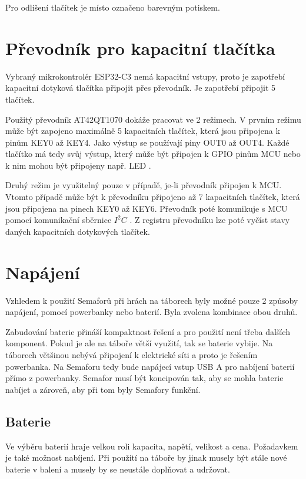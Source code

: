 Pro odlišení tlačítek je místo označeno barevným potiskem. 

\section{Převodník pro kapacitní tlačítka}
Vybraný mikrokontrolér ESP32-C3 nemá kapacitní vstupy, proto je zapotřebí kapacitní dotyková tlačítka připojit přes převodník. Je zapotřebí připojit 
5 tlačítek. 

Použitý převodník AT42QT1070 dokáže pracovat ve 2 režimech. V prvním režimu může být zapojeno maximálně 5 kapacitních tlačítek, která jsou připojena
k pinům KEY0 až KEY4. Jako výstup se používají piny OUT0 až OUT4. Každé tlačítko má tedy svůj výstup, který může být připojen k GPIO pinům MCU 
nebo k nim mohou být připojeny např. LED \cite{conv_cap_but_AT42QT1070_dtsh}. 

Druhý režim je využitelný pouze v případě, je-li převodník připojen k MCU. Vtomto případě může být k převodníku připojeno až 7 kapacitních tlačítek, 
která jsou připojena na pinech KEY0 až KEY6. Převodník poté komunikuje s MCU pomocí komunikační sběrnice $I^2C$ \cite{conv_cap_but_AT42QT1070_dtsh}. 
Z registru převodníku lze poté vyčíst stavy daných kapacitních dotykových tlačítek. 

\section{Napájení}
Vzhledem k použití Semaforů při hrách na táborech byly možné pouze 2 způsoby napájení, pomocí powerbanky nebo baterií. Byla zvolena kombinace obou druhů.

Zabudování baterie přináší kompaktnost řešení a pro použití není třeba dalších komponent. Pokud je ale na táboře větší využití, tak se baterie vybije.
Na táborech většinou nebývá připojení k elektrické síti a proto je řešením powerbanka. Na Semaforu tedy bude napájecí vstup USB A pro nabíjení baterií
přímo z powerbanky. Semafor musí být koncipován tak, aby se mohla baterie nabíjet a zároveň, aby při tom byly Semafory funkční.

\subsection{Baterie}
Ve výběru baterií hraje velkou roli kapacita, napětí, velikost a cena. Požadavkem je také možnost nabíjení. Při použití na táboře by jinak musely být stále 
nové baterie v balení a musely by se neustále doplňovat a udržovat.

